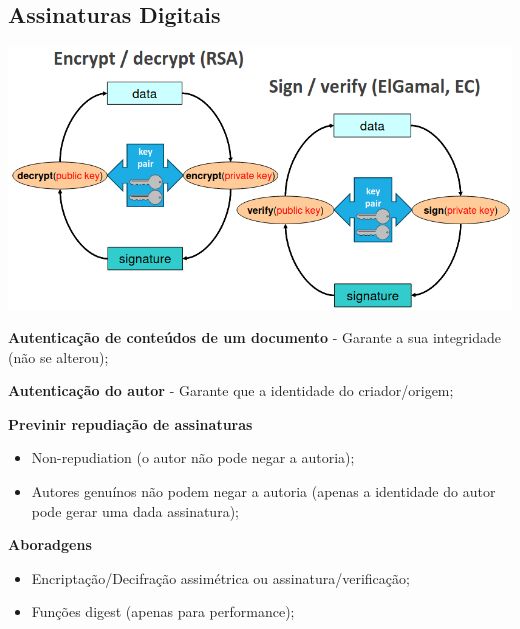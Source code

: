 \documentclass{article}
\begin{document}
\subsection{Assinaturas Digitais}

\begin{center}
  \includegraphics[scale=0.4]{10}
\end{center}

\pagebreak

\begin{flushleft}
  \textbf{Autenticação de conteúdos de um documento} - Garante a sua integridade
  (não se alterou);

  \vspace{2mm}

  \textbf{Autenticação do autor} - Garante que a identidade do criador/origem;

  \vspace{2mm}

  \textbf{Previnir repudiação de assinaturas}
  \begin{itemize}
    \item Non-repudiation (o autor não pode negar a autoria);
    \item Autores genuínos não podem negar a autoria (apenas a identidade
    do autor pode gerar uma dada assinatura);
  \end{itemize}

  \vspace{2mm}

  \textbf{Aboradgens}
  \begin{itemize}
    \item Encriptação/Decifração assimétrica ou assinatura/verificação;
    \item Funções digest (apenas para performance);
  \end{itemize}
\end{flushleft}
\end{document}
